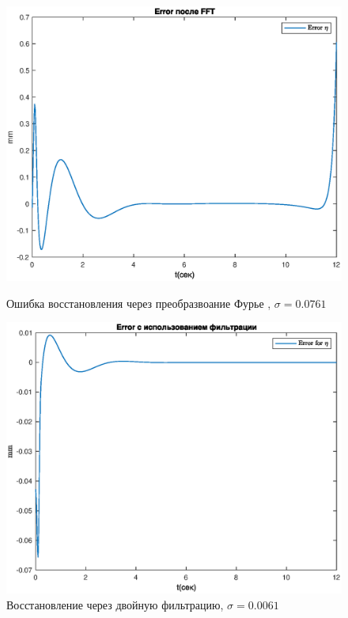 \documentclass[a4paper,12pt, openany]{book}
\theoremstyle{plain} %
\theoremstyle{definition} %
\theoremstyle{remark} %
\numberwithin{equation}{chapter}
\begin{document}
{\begin{figure}[h!]
    \begin{center}
        \begin{minipage}[h]{0.48\linewidth}
            \includegraphics[width=1\linewidth]{err_furier_model.eps}
            \caption{Ошибка восстановления через преобразвоание Фурье , $\sigma=0.0761$}
        \end{minipage}
        \hfill
        \begin{minipage}[h]{0.48\linewidth}
            \includegraphics[width=1\linewidth]{err_double_filter_model.eps}
            \caption{Восстановление через двойную фильтрацию, $\sigma=0.0061$}
        \end{minipage}
    \end{center}
\end{figure}


}
\end{document}
